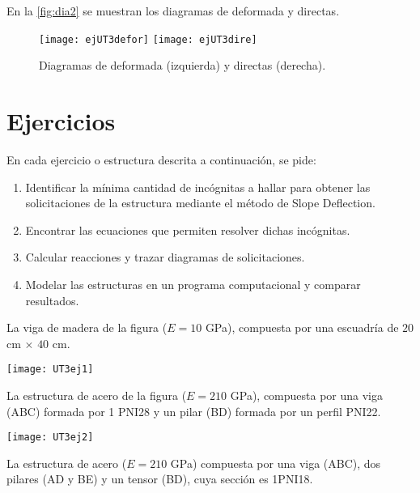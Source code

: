 En la \autoref{fig:dia2} se muestran los diagramas de deformada y directas.
\begin{figure}[htb]
	\centering
	\texttt{[image: ejUT3defor]}
	\texttt{[image: ejUT3dire]}
	\caption{Diagramas de deformada (izquierda) y directas (derecha).}
	\label{fig:dia2}
\end{figure}


\clearpage











\section{Ejercicios}
\setcounter{ejercicio}{0}

En cada ejercicio o estructura descrita a continuación, se pide:
%
\begin{enumerate}
  \item Identificar la mínima cantidad de incógnitas a hallar para obtener las solicitaciones de la estructura mediante el método de Slope Deflection.
  \item  Encontrar las ecuaciones que permiten resolver dichas incógnitas.
  \item  Calcular reacciones y trazar diagramas de solicitaciones.
  \item  Modelar las estructuras en un programa computacional y comparar resultados.
\end{enumerate}

\ejercicio

La viga de madera de la figura ($E=10$ GPa), compuesta por una escuadría de $20$ cm $\times$ $40$ cm.

\begin{center}
	\texttt{[image: UT3ej1]}
\end{center}


\ejercicio

La estructura de acero de la figura ($E=210$ GPa), compuesta por una viga (ABC) formada por 1 PNI28 y un pilar (BD) formada por un perfil PNI22.

\begin{center}
	\texttt{[image: UT3ej2]}
\end{center}


\ejercicio

La estructura de acero ($E=210$ GPa) compuesta por una viga (ABC), dos pilares (AD y BE) y un tensor (BD), cuya sección es 1PNI18.

